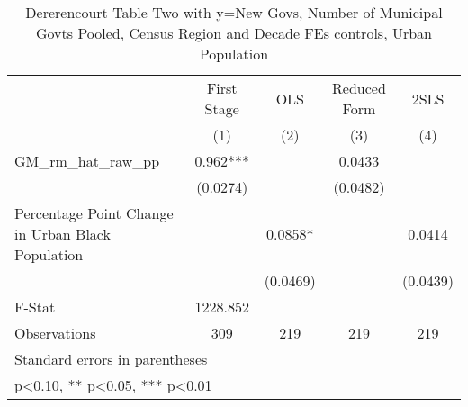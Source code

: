 \begin{table}[htbp]\centering
\def\sym#1{\ifmmode^{#1}\else\(^{#1}\)\fi}
\caption{Dererencourt Table Two with y=New Govs, Number of Municipal Govts  Pooled, Census Region and Decade FEs controls, Urban Population}
\begin{tabular}{l*{4}{c}}
\toprule
                    & First Stage   &         OLS   &Reduced Form   &        2SLS   \\
                    &\multicolumn{1}{c}{(1)}   &\multicolumn{1}{c}{(2)}   &\multicolumn{1}{c}{(3)}   &\multicolumn{1}{c}{(4)}   \\
\midrule
GM\_rm\_hat\_raw\_pp    &       0.962***&               &      0.0433   &               \\
                    &    (0.0274)   &               &    (0.0482)   &               \\
\addlinespace
Percentage Point Change in Urban Black Population&               &      0.0858*  &               &      0.0414   \\
                    &               &    (0.0469)   &               &    (0.0439)   \\
\midrule
F-Stat              &    1228.852   &               &               &               \\
Observations        &         309   &         219   &         219   &         219   \\
\bottomrule
\multicolumn{5}{l}{\footnotesize Standard errors in parentheses}\\
\multicolumn{5}{l}{\footnotesize * p<0.10, ** p<0.05, *** p<0.01}\\
\end{tabular}
\end{table}

